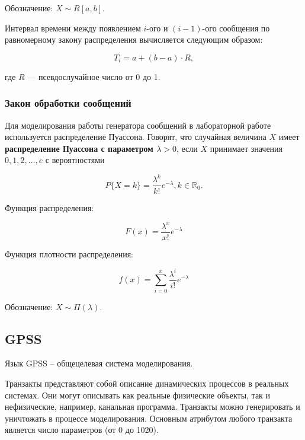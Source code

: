 Обозначение: $X \sim R[a, b]$.

Интервал времени между появлением $i$-ого и $(i - 1)$-ого сообщения по равномерному закону распределения вычисляется следующим образом:

\begin{equation}
	T_{i} = a + (b - a) \cdot R,
\end{equation}

\noindent где $R$ --- псевдослучайное число от 0 до 1.

\subsubsection*{Закон обработки сообщений}

Для моделирования работы генератора сообщений в лабораторной работе используется распределение Пуассона.
Говорят, что случайная величина $X$ имеет \textbf{распределение Пуассона с параметром $\lambda > 0$}, если $X$ принимает значения $0, 1, 2, \dots, e$ с вероятностями 

\begin{equation}
	P\{X=k\} = \frac{\lambda^k}{k!} e^{-\lambda}, k \in \mathbb{R}_0.
\end{equation}

Функция распределения:

\begin{equation}
	F(x) = \frac{\lambda^x}{x!} e^{-\lambda}
\end{equation}

Функция плотности распределения: 

\begin{equation}
	f(x) = \sum\limits_{i = 0}^{x} \frac{\lambda^i}{i!} e^{-\lambda}
\end{equation}

Обозначение: $X \sim \Pi(\lambda)$.

\subsection{GPSS}

Язык GPSS – общецелевая система моделирования.

Транзакты представляют собой описание динамических процессов в
реальных системах. Они могут описывать как реальные физические объекты,
так и нефизические, например, канальная программа. Транзакты можно
генерировать и уничтожать в процессе моделирования. Основным атрибутом
любого транзакта является число параметров (от 0 до 1020).

